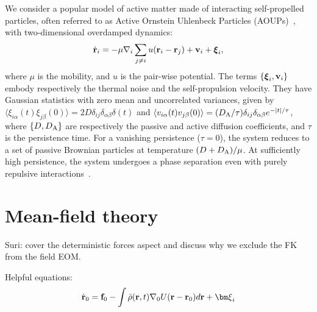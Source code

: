 \documentclass[superscriptaddress, twocolumn, prl, longbibliography, nofootinbib]{revtex4-1}
\begin{document}



We consider a popular model of active matter made of interacting self-propelled particles, often referred to as Active Ornstein Uhlenbeck Particles (AOUPs)~\cite{Szamel2014, Maggi2015, Nardini2016}, with two-dimensional overdamped dynamics:
\begin{equation}
	\dot{\bf r}_i = -\mu\nabla_i \sum_{j\neq i} u({\bf r}_i-{\bf r}_j) + {\bf v}_i + {\boldsymbol\xi}_i ,
\end{equation}
where $\mu$ is the mobility, and $u$ is the pair-wise potential. The terms $\{{\boldsymbol\xi}_i,{\bf v}_i\}$ embody respectively the thermal noise and the self-propulsion velocity. They have Gaussian statistics with zero mean and uncorrelated variances, given by $\langle\xi_{i\alpha}(t)\xi_{j\beta}(0)\rangle = 2D \delta_{ij}\delta_{\alpha\beta}\delta(t)$ and $\langle v_{i\alpha}(t)v_{j\beta}(0)\rangle = (D_{\rm A}/\tau) \delta_{ij}\delta_{\alpha\beta}e^{-|t|/\tau}$, where $\{D,D_{\rm A}\}$ are respectively the passive and active diffusion coefficients, and $\tau$ is the persistence time. For a vanishing persistence ($\tau=0$), the system reduces to a set of passive Brownian particles at temperature $(D+D_{\rm A})/\mu$. At sufficiently high persistence, the system undergoes a phase separation even with purely repulsive interactions~\cite{Nardini2016, Maggi2020}.




\section{Mean-field theory}

Suri: cover the deterministic forces aspect and discuss why we exclude the FK from the field EOM.

Helpful equations:
\begin{equation}\label{eq:tracer_EOM}
\dot{\bf r}_0 = {\bf f}_0 - \int \bar{\rho}({\bf r}, t) \nabla_0 U({\bf r} -{\bf r}_0) d{\bf r} + {\bm \xi}_i
\end{equation}
\end{document}
